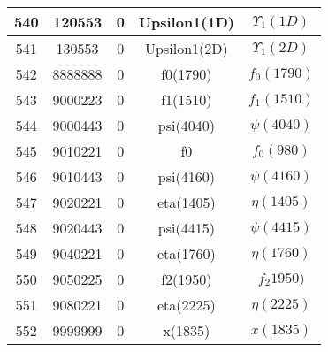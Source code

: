 \documentclass{article}
\begin{document}
\begin{table}[!htbp]
\begin{tabular}{|c|c|c|c|c|}
\hline
540 & 120553 & 0 & Upsilon\underline{\hspace{0.6em}}1(1D) & $\Upsilon_1(1D)$ \\
\hline
541 & 130553 & 0 & Upsilon\underline{\hspace{0.6em}}1(2D) & $\Upsilon_{1}(2D)$ \\
\hline
542 & 8888888 & 0 & f\underline{\hspace{0.6em}}0(1790) & $f_{0}(1790)$ \\
\hline
543 & 9000223 & 0 & f\underline{\hspace{0.6em}}1(1510) & $f_{1}(1510)$ \\
\hline
544 & 9000443 & 0 & psi(4040) & $\psi(4040)$ \\
\hline
545 & 9010221 & 0 & f\underline{\hspace{0.6em}}0 & $f_{0}(980)$ \\
\hline
546 & 9010443 & 0 & psi(4160) & $\psi(4160)$ \\
\hline
547 & 9020221 & 0 & eta(1405) & $\eta(1405)$ \\
\hline
548 & 9020443 & 0 & psi(4415) & $\psi(4415)$ \\
\hline
549 & 9040221 & 0 & eta(1760) & $\eta(1760)$ \\
\hline
550 & 9050225 & 0 & f\underline{\hspace{0.6em}}2(1950) & $f_{2}1950)$ \\
\hline
551 & 9080221 & 0 & eta(2225) & $\eta(2225)$ \\
\hline
552 & 9999999 & 0 & x(1835) & $x(1835)$ \\
\hline
\end{tabular}
\end{table}

\clearpage
\end{document}
